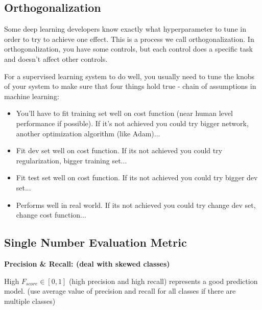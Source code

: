 \documentclass{article}
\begin{document}
\subsection{Orthogonalization}

\noindent Some deep learning developers know exactly what hyperparameter to tune in order to try to achieve one effect. This is a process we call orthogonalization. In orthogonalization, you have some controls, but each control does a specific task and doesn't affect other controls.

\bigskip

\noindent For a supervised learning system to do well, you usually need to tune the knobs of your system to make sure that four things hold true - chain of assumptions in machine learning:

\begin{itemize}
    \item You'll have to fit training set well on cost function (near human level performance if possible). If it's not achieved you could try bigger network, another optimization algorithm (like Adam)...
    \item Fit dev set well on cost function. If its not achieved you could try regularization, bigger training set...
    \item Fit test set well on cost function. If its not achieved you could try bigger dev set...
    \item Performs well in real world. If its not achieved you could try change dev set, change cost function...
\end{itemize}

\subsection{Single Number Evaluation Metric}

\noindent \textbf{Precision \& Recall: (deal with skewed classes)}

\noindent High \(F_{score} \in [0, 1]\) (high precision and high recall) represents a good prediction model. (use average value of precision and recall for all classes if there are multiple classes)
\end{document}
